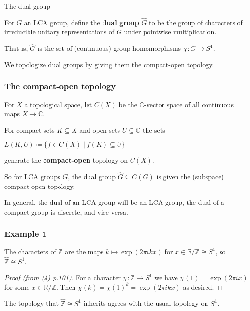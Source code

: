 \documentclass[mathserif
]{beamer}
\begin{document}
\begin{frame}{The dual group}
    \begin{definition}
        For $G$ an LCA group, define the \textbf{dual group} $\widehat{\hspace{0pt}G}$ to be the group of characters of irreducible unitary representations of $G$ under pointwise multiplication.\pause 
        
        That is, $\widehat{\hspace{0pt}G}$ is the set of (continuous) group homomorphisms $\chi\colon G\to S^1$.
    \end{definition} %
    \pause

    We topologize dual groups by giving them the compact-open topology.
\end{frame}

\begin{frame}
    \frametitle{The compact-open topology}
    \begin{definition}
        For $X$ a topological space, let $C(X)$ be the $\mathbb{C}$-vector space of all continuous maps $X\to \mathbb C$.
        \pause 

        For compact sets $K\subseteq X$ and open sets $U\subseteq \mathbb C$ the sets \begin{center}
            $L(K,U)\coloneqq\{f\in C(X)\mid f(K)\subseteq U\}$
        \end{center} generate the \textbf{compact-open} topology on $C(X)$.
    \end{definition} 
    \pause
    
    So for LCA groups $G$, the dual group $\widehat{\hspace{0pt}G}\subseteq C(G)$ is given the (subspace) compact-open topology.\pause 

    In general, the dual of an LCA group will be an LCA group, the dual of a compact group is discrete, and vice versa.
\end{frame}

\begin{frame}
    \frametitle{Example 1}
The characters of $\mathbb{Z}$ are the maps $k\mapsto \exp(2\pi i k x)$ for $x\in \mathbb{R}/\mathbb{Z}\cong S^1$, so $\widehat{\mathbb{Z}}\cong S^1$. \pause 
\begin{proof}[Proof (from (4) p.101)]
    For a character $\chi\colon \mathbb{Z}\to S^1$ we have $\chi(1) = \exp(2\pi i x)$ for some $x\in \mathbb{R}/\mathbb{Z}$. Then $\chi(k) = \chi(1)^k = \exp(2\pi i k x)$ as desired.
\end{proof}
\pause 

The topology that $\widehat{\mathbb{Z}}\cong S^1$ inherits agrees with the usual topology on $S^1$.
\end{frame}
\end{document}

